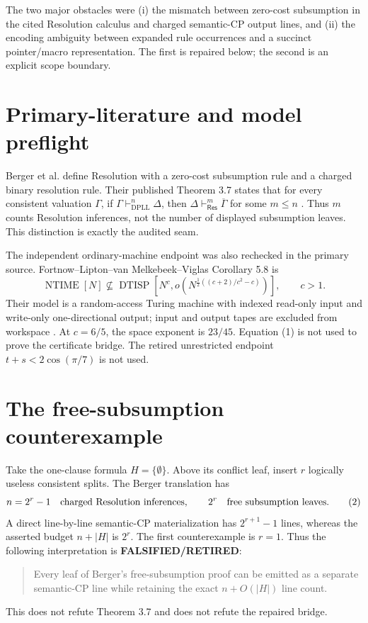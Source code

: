 \documentclass[11pt]{article}
\newcommand{\Res}{\mathsf{Res}}
\newcommand{\RET}{\textbf{FALSIFIED/RETIRED}}
\begin{document}
The two major obstacles were (i) the mismatch between zero-cost subsumption
in the cited Resolution calculus and charged semantic-CP output lines, and
(ii) the encoding ambiguity between expanded rule occurrences and a succinct
pointer/macro representation.  The first is repaired below; the second is an
explicit scope boundary.

\section{Primary-literature and model preflight}
Berger et al. define Resolution with a zero-cost subsumption rule and a
charged binary resolution rule.  Their published Theorem 3.7 states that for
every consistent valuation $\Gamma$, if
$\Gamma\vdash_{\mathrm{DPLL}}^n\Delta$, then
$\Delta\vdash_{\Res}^m\overline\Gamma$ for some $m\le n$
\cite{berger}.  Thus $m$ counts Resolution inferences, not the number of
displayed subsumption leaves.  This distinction is exactly the audited seam.

The independent ordinary-machine endpoint was also rechecked in the primary
source.  Fortnow--Lipton--van Melkebeek--Viglas Corollary 5.8 is
\[
 \operatorname{NTIME}[N]\not\subseteq
 \operatorname{DTISP}\!\left[
 N^c,o\!\left(N^{\frac12((c+2)/c^2-c)}\right)\right],\qquad c>1. \tag{1}
\]
Their model is a random-access Turing machine with indexed read-only input
and write-only one-directional output; input and output tapes are excluded
from workspace \cite{flmv}.  At $c=6/5$, the space exponent is $23/45$.
Equation (1) is not used to prove the certificate bridge.  The retired
unrestricted endpoint $t+s<2\cos(\pi/7)$ is not used.

\section{The free-subsumption counterexample}
Take the one-clause formula $H=\{\emptyset\}$.  Above its conflict leaf,
insert $r$ logically useless consistent splits.  The Berger translation has
\[
       n=2^r-1\quad\hbox{charged Resolution inferences},
       \qquad 2^r\quad\hbox{free subsumption leaves}.      \tag{2}
\]
A direct line-by-line semantic-CP materialization has $2^{r+1}-1$ lines,
whereas the asserted budget $n+|H|$ is $2^r$.  The first counterexample is
$r=1$.  Thus the following interpretation is \RET{}:
\begin{quote}
Every leaf of Berger's free-subsumption proof can be emitted as a separate
semantic-CP line while retaining the exact $n+O(|H|)$ line count.
\end{quote}
This does not refute Theorem 3.7 and does not refute the repaired bridge.
\end{document}
